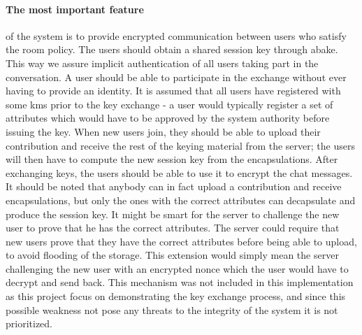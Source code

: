 \paragraph{The most important feature} of the system is to provide encrypted communication between users who satisfy the room policy. The users should obtain a shared session key through \gls{abake}. This way we assure implicit authentication of all users taking part in the conversation. A user should be able to participate in the exchange without ever having to provide an identity. It is assumed that all users have registered with some \gls{kms} prior to the key exchange - a user would typically register a set of attributes which would have to be approved by the system authority before issuing the key. When new users join, they should be able to upload their contribution and receive the rest of the keying material from the server; the users will then have to compute the new session key from the encapsulations. After exchanging keys, the users should be able to use it to encrypt the chat messages. It should be noted that anybody can in fact upload a contribution and receive encapsulations, but only the ones with the correct attributes can decapsulate and produce the session key. It might be smart for the server to challenge the new user to prove that he has the correct attributes. The server could require that new users prove that they have the correct attributes before being able to upload, to avoid flooding of the storage. This extension would simply mean the server challenging the new user with an encrypted nonce which the user would have to decrypt and send back. This mechanism was not included in this implementation as this project focus on demonstrating the key exchange process, and since this possible weakness not pose any threats to the integrity of the system it is not prioritized. 




